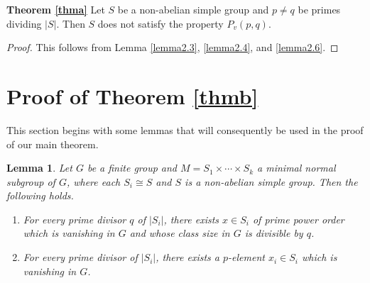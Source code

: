 \documentclass[11pt, a4paper]{article}
\numberwithin{equation}{section}
\theoremstyle{plain} %
\newtheorem{lemma}[theorem]{Lemma}
\begin{document}
\noindent\textbf{Theorem \ref{thma}}\label{prop P(p,q)}
Let $S$ be a non-abelian simple group and $p\neq q$ be primes dividing $|S|$. Then $S$ does not satisfy the property $P_v(p,q)$.
\begin{proof}
This follows from Lemma \ref{lemma2.3}, \ref{lemma2.4}, and \ref{lemma2.6}.
\end{proof}



\section{Proof of Theorem \ref{thmb}}
This section begins with some lemmas that will consequently be used in the proof of our main theorem.
\begin{lemma}\label{cor:vanishing_minimal_normal_combined}
Let $G$ be a finite group and $M=S_1\times \cdots \times S_k$ a minimal normal subgroup of $G$, where each $S_i\cong S$ and $S$ is a non-abelian simple group. Then the following holds.
\begin{enumerate}
\item For every prime divisor $q$ of $|S_i|$, there exists $x\in S_i$ of prime power order which is vanishing in $G$ and whose class size in $G$ is divisible by $q$.%

\item For every prime divisor of $|S_i|$, there exists a $p$-element $x_i\in S_i$ which is vanishing in $G$.
\end{enumerate}
\end{lemma}
\end{document}
